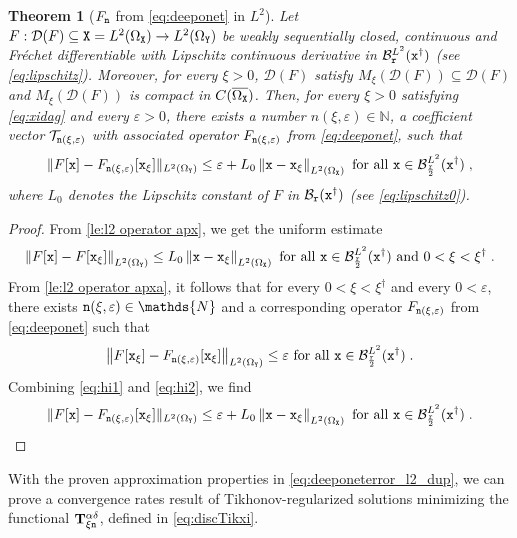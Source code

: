 \documentclass[10pt]{article}
\numberwithin{equation}{section}
\newtheorem{theorem}[theorem]{Theorem}
\theoremstyle{nonumberplain}
\newtheorem{proof}{Proof}
\newcommand{\N}{\mathds{N}}
\newcommand{\dom}[1]{\mathcal{D}\left(#1\right)}
\newcommand{\norm}[1]{\left\|#1\right\|}
\newcommand{\norms}[1]{\|#1\|}
\newcommand{\ve}{\varepsilon}
\newcommand{\X}{{\tt X}}
\newcommand{\Y}{{\tt Y}}
\newcommand{\n}{{\tt n}}
\newcommand{\x}{{\tt x}}
\newcommand{\xdag}{\x^\dagger}
\newcommand{\Tik}{\mathbf{T}}
\begin{document}
\begin{theorem}[$F_\n$ from \autoref{eq:deeponet} in $L^2$]\label{th:l2 operator apx}
	Let $F: \mathcal{D}(F) \subseteq \X=L^2(\Omega_\X) \to L^2(\Omega_\Y)$ be weakly sequentially closed, continuous and Fr\'echet differentiable with Lipschitz continuous derivative in $\mathcal{B}^{L^2}_{\tt r}(\xdag)$ (see \autoref{eq:lipschitz}). Moreover, for every $\xi > 0$, $\dom{F}$ satisfy $M_\xi(\dom{F}) \subseteq \dom{F}$ and $M_\xi(\dom{F})$ is compact in $C(\overline{\Omega_\X})$. Then, for every $\xi > 0$ satisfying \autoref{eq:xidag} and every $\ve > 0$, there exists a number $n(\xi,\ve)\in \N$, a coefficient vector $\mathcal{T}_{\n(\xi,\ve)}$ with associated operator $F_{\n(\xi,\ve)}$ from \autoref{eq:deeponet}, such that	
	\begin{equation}\label{eq:deeponeterror_l2}
		\norms{F[\x] - F_{\n(\xi,\ve)}[\x_{\xi}]}_{L^2(\Omega_\Y)} \leq \ve + L_0 \norm{\x - \x_{\xi}}_{L^2(\Omega_\X)} \text{ for all } \x \in \mathcal{B}_{\frac{\tt r}{2}}^{L^2}(\xdag)\;,
	\end{equation}
where $L_0$ denotes the Lipschitz constant of $F$ in $\mathcal{B}_{\tt r}(\xdag)$ (see \autoref{eq:lipschitz0}).
\end{theorem}
\begin{proof}
From \autoref{le:l2 operator apx}, we get the uniform estimate 
\begin{equation} \label{eq:hi1}
	\norm{F[\x]-F[\x_\xi]}_{L^2(\Omega_\Y)} \leq L_0 \norm{\x - \x_\xi}_{L^2(\Omega_\X)} \text{ for all } \x \in \mathcal{B}_{\frac{\tt r}{2}}^{L^2}(\xdag) \text{ and } 0 < \xi < \xi^\dagger\;.
\end{equation}
From \autoref{le:l2 operator apxa}, it follows that for every $0 < \xi < \xi^\dagger$ and every $0 < \ve$, there exists $\n(\xi,\ve) \in \N$ and a corresponding operator $F_{\n(\xi,\ve)}$ from \autoref{eq:deeponet} such that
\begin{equation} \label{eq:hi2}
	\norm{F[\x_{\xi}] - F_{\n(\xi,\ve)}[\x_{\xi}]}_{L^2(\Omega_\Y)} \leq \ve  \text{ for all } \x \in \mathcal{B}_{\frac{\tt r}{2}}^{L^2}(\xdag)\;.
\end{equation}
Combining \autoref{eq:hi1} and \autoref{eq:hi2}, we find
\begin{equation*}
	\begin{aligned}
		\norms{F[\x] - F_{\n(\xi,\ve)}[\x_{\xi}]}_{L^2(\Omega_\Y)} \leq \ve + L_0\norm{\x - \x_{\xi}}_{L^2(\Omega_\X)} \text{ for all } \x \in \mathcal{B}_{\frac{\tt r}{2}}^{L^2}(\xdag)\;.
	\end{aligned}
	\end{equation*}
\end{proof}
With the proven approximation properties in \autoref{eq:deeponeterror_l2_dup}, we can prove a convergence rates result of Tikhonov-regularized solutions minimizing the functional $\Tik_{\xi\n}^{\alpha\delta}$, defined in \autoref{eq:discTikxi}.
\end{document}
